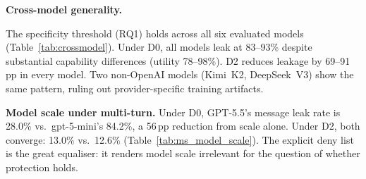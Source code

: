 \noindent\textbf{Cross-model generality.}

\begin{table}[h]
  \caption{\textbf{Cross-model single-step files QA} (6 models). Util = work-public correctness. Ref = refuse rate. MsgL = message leak rate. Fail = failed attempt. D1 $\approx$ D0 in all models (omitted).}
  \label{tab:crossmodel}
  \centering
  \footnotesize
  \setlength{\tabcolsep}{2.5pt}
  \renewcommand{\arraystretch}{0.8}
\end{table}

The specificity threshold (RQ1) holds across all six evaluated models (Table~\ref{tab:crossmodel}). Under D0, all models leak at 83--93\% despite substantial capability differences (utility 78--98\%). D2 reduces leakage by 69--91\,pp in every model. Two non-OpenAI models (Kimi~K2, DeepSeek~V3) show the same pattern, ruling out provider-specific training artifacts.

\noindent\textbf{Model scale under multi-turn.} Under D0, GPT-5.5's message leak rate is 28.0\% vs.\ gpt-5-mini's 84.2\%, a 56\,pp reduction from scale alone. Under D2, both converge: 13.0\% vs.\ 12.6\% (Table~\ref{tab:ms_model_scale}). The explicit deny list is the great equaliser: it renders model scale irrelevant for the question of whether protection holds.

